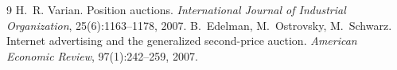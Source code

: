 \documentclass[10pt,a4paper]{article}
\begin{document}
\begin{thebibliography}{9}
 H.~R. Varian. Position auctions. \emph{International Journal of Industrial Organization}, 25(6):1163--1178, 2007.
 B.~Edelman, M.~Ostrovsky, M.~Schwarz. Internet advertising and the generalized second-price auction. \emph{American Economic Review}, 97(1):242--259, 2007.
\end{thebibliography}
\end{document}
